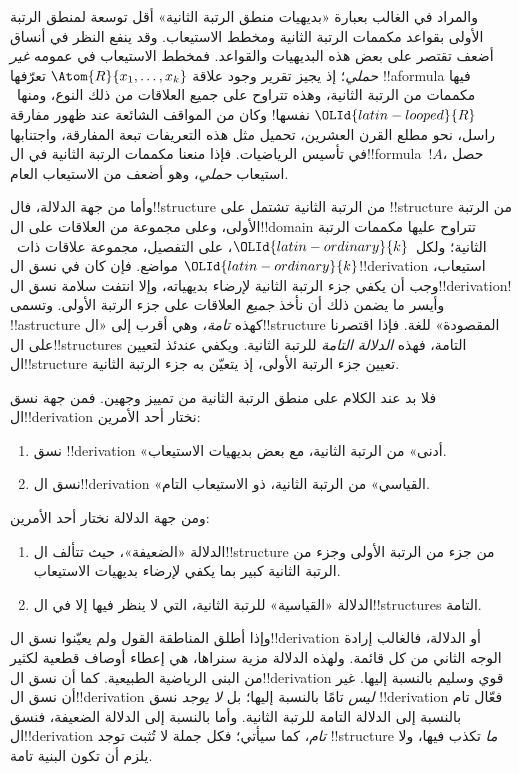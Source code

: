 \documentclass[../../../include/open-logic-section]{subfiles}
\begin{document}
والمراد في الغالب بعبارة «بديهيات منطق الرتبة الثانية» أقل
توسعة لمنطق الرتبة الأولى بقواعد مكممات الرتبة الثانية ومخطط
الاستيعاب. وقد ينفع النظر في أنساق أضعف تقتصر على بعض هذه
البديهيات والقواعد. فمخطط الاستيعاب في عمومه \emph{غير حملي}؛
إذ يجيز تقرير وجود علاقة $\Atom{R}{x_1, \dots, x_k}$ تعرّفها
!!a{formula} فيها مكممات من الرتبة الثانية، وهذه تتراوح على
جميع العلاقات من ذلك النوع، ومنها~$\OLId{latin-looped}{R}$ نفسها!{} وكان من
المواقف الشائعة عند ظهور مفارقة راسل، نحو مطلع القرن العشرين،
تحميل مثل هذه التعريفات تبعة المفارقة، واجتنابها في تأسيس
الرياضيات. فإذا منعنا مكممات الرتبة الثانية في
ال!!{formula}~$!A$، حصل استيعاب {\em حملي}، وهو أضعف من
الاستيعاب العام.

وأما من جهة الدلالة، فال!!{structure} من الرتبة الثانية
تشتمل على !!{structure} من الرتبة الأولى، وعلى مجموعة من
العلاقات على ال!!{domain} تتراوح عليها مكممات الرتبة الثانية؛
ولكل~$\OLId{latin-ordinary}{k}$، على التفصيل، مجموعة علاقات ذات~$\OLId{latin-ordinary}{k}$ مواضع.
فإن كان في نسق ال!!{derivation} استيعاب، وجب أن يكفي جزء
الرتبة الثانية لإرضاء بديهياته، وإلا انتفت سلامة نسق
ال!!{derivation}!{} وأيسر ما يضمن ذلك أن نأخذ
\emph{جميع} العلاقات على جزء الرتبة الأولى. وتسمى
!!a{structure} كهذه \emph{تامة}، وهي أقرب إلى
«ال!!{structure} المقصودة» للغة. فإذا اقتصرنا على
ال!!{structure}s التامة، فهذه \emph{الدلالة التامة} للرتبة
الثانية. ويكفي عندئذ لتعيين ال!!{structure} تعيين جزء الرتبة
الأولى، إذ يتعيّن به جزء الرتبة الثانية.

فلا بد عند الكلام على منطق الرتبة الثانية من تمييز وجهين.
فمن جهة نسق ال!!{derivation} نختار أحد الأمرين:
\begin{enumerate}
\item نسق !!{derivation} «أدنى» من الرتبة الثانية، مع بعض بديهيات
  الاستيعاب.
\item نسق ال!!{derivation} «القياسي» من الرتبة الثانية، ذو الاستيعاب
  التام.
\end{enumerate}
ومن جهة الدلالة نختار أحد الأمرين:
\begin{enumerate}
\item الدلالة «الضعيفة»، حيث تتألف ال!!{structure} من جزء من الرتبة
  الأولى وجزء من الرتبة الثانية كبير بما يكفي لإرضاء بديهيات
  الاستيعاب.
\item الدلالة «القياسية» للرتبة الثانية، التي لا ينظر فيها إلا في
  ال!!{structure}s التامة.
\end{enumerate}
وإذا أطلق المناطقة القول ولم يعيّنوا نسق ال!!{derivation}
أو الدلالة، فالغالب إرادة الوجه الثاني من كل قائمة. ولهذه
الدلالة مزية سنراها، هي إعطاء أوصاف قطعية لكثير من البنى
الرياضية الطبيعية. كما أن نسق ال!!{derivation} قوي وسليم
بالنسبة إليها. غير أن نسق ال!!{derivation} \emph{ليس} تامًا
بالنسبة إليها؛ بل \emph{لا يوجد} نسق !!{derivation} فعّال تام
بالنسبة إلى الدلالة التامة للرتبة الثانية. وأما بالنسبة إلى
الدلالة الضعيفة، فنسق ال!!{derivation} \emph{تام}، كما سيأتي؛
فكل جملة لا تُثبت توجد !!{structure} \emph{ما} تكذب فيها،
ولا يلزم أن تكون البنية تامة.
\end{document}

